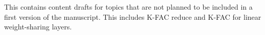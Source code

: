 This contains content drafts for topics that are not planned to be included in a first version of the manuscript. This includes K-FAC reduce and K-FAC for linear weight-sharing layers.